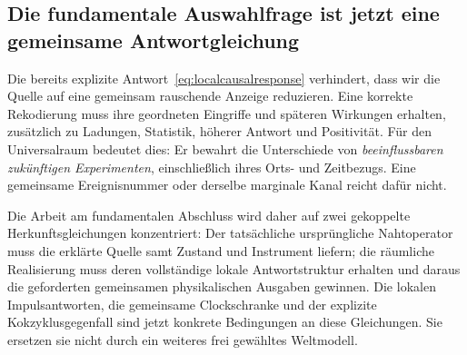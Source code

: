 \subsection{Die fundamentale Auswahlfrage ist jetzt eine gemeinsame Antwortgleichung}
\begin{center}
\end{center}

Die bereits explizite Antwort~\eqref{eq:localcausalresponse} verhindert, dass wir die Quelle auf eine gemeinsam rauschende Anzeige reduzieren. Eine korrekte Rekodierung muss ihre geordneten Eingriffe und späteren Wirkungen erhalten, zusätzlich zu Ladungen, Statistik, höherer Antwort und Positivität. Für den Universalraum bedeutet dies: Er bewahrt die Unterschiede von \emph{beeinflussbaren zukünftigen Experimenten}, einschließlich ihres Orts- und Zeitbezugs. Eine gemeinsame Ereignisnummer oder derselbe marginale Kanal reicht dafür nicht.

Die Arbeit am fundamentalen Abschluss wird daher auf zwei gekoppelte Herkunftsgleichungen konzentriert: Der tatsächliche ursprüngliche Nahtoperator muss die erklärte Quelle samt Zustand und Instrument liefern; die räumliche Realisierung muss deren vollständige lokale Antwortstruktur erhalten und daraus die geforderten gemeinsamen physikalischen Ausgaben gewinnen. Die lokalen Impulsantworten, die gemeinsame Clockschranke und der explizite Kokzyklusgegenfall sind jetzt konkrete Bedingungen an diese Gleichungen. Sie ersetzen sie nicht durch ein weiteres frei gewähltes Weltmodell.




